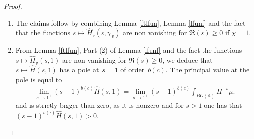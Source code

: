 \documentclass[a4paper,english,12pt]{amsart}
\newcommand{\CC}{\mathbb{C}}
\newcommand{\oF}{\overline F}
\newcommand{\vMFi}{v\in M_F ^\infty}
\newcommand{\AAA}{\mathbb A}
\newcommand{\wH}{\widehat H}
\numberwithin{equation}{subsection}
\begin{document}
\begin{proof}
\begin{enumerate}
\item The claims follow by combining Lemma \ref{ftlfun}, Lemma \ref{lfunf} and the fact that the functions  $s\mapsto\wH_v(s,\chi_v)$ are non vanishing for $\Re(s)\geq 0$ if $\chi=1$.
\item From Lemma \ref{ftlfun}, Part (2) of Lemma \ref{lfunf} and the fact the functions  $s\mapsto\wH_v(s,1)$ are non vanishing for $\Re(s)\geq 0$, 
we deduce that $s\mapsto\wH(s,1)$ has a pole at~$s=1$ of order~$b(c)$. The principal value at the pole is equal to \begin{align*}\lim_{s\to 1^+}(s-1)^{b(c)}\wH(s,1)=\lim_{s\to 1^+}(s-1)^{b(c)}\int_{BG(\AAA)}H^{-s}\mu.
\end{align*} and is strictly bigger than zero, as it is nonzero and for $s>1$ one has that $(s-1)^{b(c)}\wH(s,1)>0.$ %
%
\end{enumerate}
\end{proof}
\end{document}
